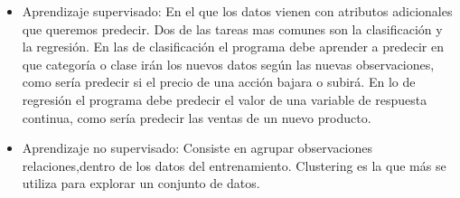 	\begin{itemize}
		\item Aprendizaje supervisado: En el que los datos vienen con atributos adicionales que queremos predecir. Dos de las tareas mas comunes son la clasificación y la regresión. En las de clasificación el programa debe aprender a predecir en que categoría o clase irán los nuevos datos según las nuevas observaciones, como sería predecir si el precio de una acción bajara o subirá. En lo de regresión el programa debe predecir el valor de una variable de respuesta continua, como sería predecir las ventas de un nuevo producto. 

		\item Aprendizaje no supervisado: Consiste en agrupar observaciones relaciones,dentro de los datos del entrenamiento. Clustering es la que más se utiliza para explorar un conjunto de datos.

	\end{itemize}
